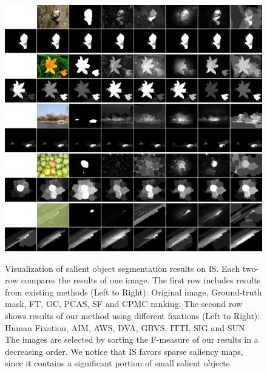 \begin{figure}[p]
\centering
\includegraphics[width=\linewidth]{imgsal_final.jpg}\\
\caption{Visualization of salient object segmentation results on IS. Each two-row compares the results of one image.  The first row includes results from existing methods (Left to Right): Original image, Ground-truth mask, FT, GC, PCAS, SF and CPMC ranking; The second row shows results of our method using different fixations (Left to Right): Human Fixation, AIM, AWS, DVA, GBVS, ITTI, SIG and SUN. The images are selected by sorting the F-measure of our results in a decreasing order. We notice that IS favors sparse saliency maps, since it contains a significant portion of small salient objects.}\label{fig:isRes}
\end{figure}

